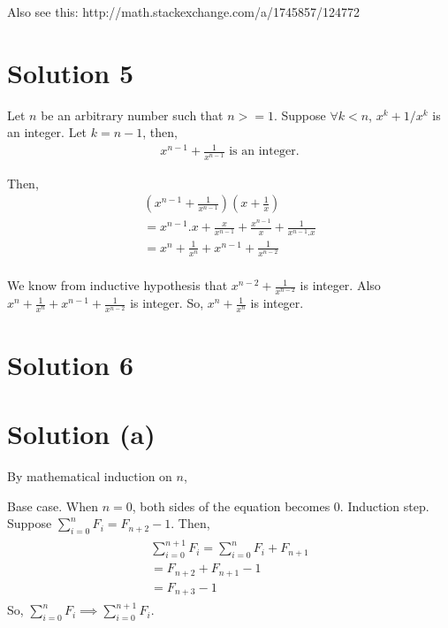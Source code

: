 \documentclass{article}
\begin{document}
Also see this: http://math.stackexchange.com/a/1745857/124772

\section{Solution 5}

Let $n$ be an arbitrary number such that $n >= 1$. Suppose $\forall k < n$, $x^k + 1/x^k$ is an integer. Let $k = n-1$, then,
\begin{gather*}
  x^{n-1} + \frac{1}{x^{n-1}} \text{ is an integer.}
\end{gather*}

Then,
\begin{gather*}
  (x^{n-1} + \frac{1}{x^{n-1}})(x + \frac{1}{x}) \\
  = x^{n-1}.x + \frac{x}{x^{n-1}} + \frac{x^{n-1}}{x} + \frac{1}{x^{n-1}.x} \\
  = x^n + \frac{1}{x^n} + x^{n-1} + \frac{1}{x^{n-2}} \\
\end{gather*}

We know from inductive hypothesis that $x^{n-2} + \frac{1}{x^{n-2}}$  is integer. Also $x^n + \frac{1}{x^n} + x^{n-1} + \frac{1}{x^{n-2}}$ is integer. So, $x^n + \frac{1}{x^n}$ is integer.

\section{Solution 6}
\section{Solution (a)}
By mathematical induction on $n$,

Base case. When $n = 0$, both sides of the equation becomes $0$.
Induction step. Suppose $\sum_{i=0}^{n} F_i = F_{n+2} - 1$. Then,
\begin{gather*}
  \begin{align}
  \sum_{i=0}^{n+1} F_i = \sum_{i=0}^{n} F_i + F_{n+1} \\
  = F_{n+2} + F_{n+1} - 1 \\
    = F_{n+3} - 1
  \end{align}
\end{gather*}
So, $\sum_{i=0}^{n} F_i \implies \sum_{i=0}^{n+1} F_i$.
\end{document}

